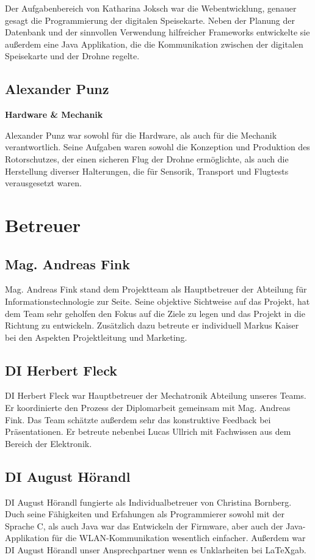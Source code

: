   Der Aufgabenbereich von Katharina Joksch war die Webentwicklung, genauer gesagt die Programmierung der digitalen Speisekarte.
  Neben der Planung der Datenbank und der sinnvollen Verwendung hilfreicher Frameworks entwickelte sie außerdem eine Java Applikation,
  die die Kommunikation zwischen der digitalen Speisekarte und der Drohne regelte.

  \subsection*{Alexander Punz}
  \textbf{Hardware \& Mechanik}

  Alexander Punz war sowohl für die Hardware, als auch für die Mechanik verantwortlich. Seine Aufgaben waren sowohl die Konzeption
  und Produktion des Rotorschutzes, der einen sicheren Flug der Drohne ermöglichte, als auch die Herstellung diverser Halterungen,
  die für Sensorik, Transport und Flugtests verausgesetzt waren.

\section{Betreuer}
  \subsection*{Mag. Andreas Fink}
  Mag. Andreas Fink stand dem Projektteam als Hauptbetreuer der Abteilung für Informationstechnologie zur Seite.
  Seine objektive Sichtweise auf das Projekt, hat dem Team sehr geholfen den Fokus auf die Ziele zu legen und
  das Projekt in die Richtung zu entwickeln.
  Zusätzlich dazu betreute er individuell Markus Kaiser bei den Aspekten Projektleitung und Marketing.

  \subsection*{DI Herbert Fleck}
  DI Herbert Fleck war Hauptbetreuer der Mechatronik Abteilung unseres Teams. Er koordinierte den Prozess der Diplomarbeit
  gemeinsam mit Mag. Andreas Fink. Das Team schätzte außerdem sehr das konstruktive Feedback bei Präsentationen.
  Er betreute nebenbei Lucas Ullrich mit Fachwissen aus dem Bereich der Elektronik.

  \subsection*{DI August Hörandl}
  DI August Hörandl fungierte als Individualbetreuer von Christina Bornberg. Duch seine Fähigkeiten und
  Erfahungen als Programmierer sowohl mit der Sprache C, als auch Java war das Entwickeln der Firmware,
  aber auch der Java-Applikation für die WLAN-Kommunikation wesentlich einfacher. Außerdem war
  DI August Hörandl unser Ansprechpartner wenn es Unklarheiten bei \LaTeX gab.

